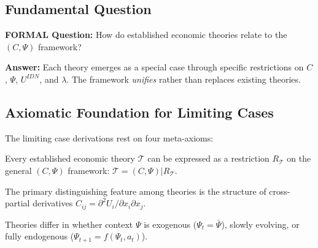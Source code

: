 
\subsection{Fundamental Question}

\begin{tcolorbox}[colback=purple!5!white, colframe=purple!75!black]
\textbf{FORMAL Question:} How do established economic theories relate to
the $(C, \Psi)$ framework?

\textbf{Answer:} Each theory emerges as a special case through specific
restrictions on $C$, $\Psi$, $U^{IDN}$, and $\lambda$. The framework
\textit{unifies} rather than replaces existing theories.
\end{tcolorbox}


\subsection{Axiomatic Foundation for Limiting Cases}
\label{sec:A-axioms}

The limiting case derivations rest on four meta-axioms:

\begin{axiom}
\label{ax:A-A1}
Every established economic theory $\mathcal{T}$ can be expressed as a
restriction $R_\mathcal{T}$ on the general $(C, \Psi)$ framework:
$\mathcal{T} = (C, \Psi) | R_\mathcal{T}$.
\end{axiom}

\begin{axiom}
\label{ax:A-A2}
The primary distinguishing feature among theories is the structure of
cross-partial derivatives $C_{ij} = \partial^2 U_i / \partial x_i \partial x_j$.
\end{axiom}

\begin{axiom}
\label{ax:A-A3}
Theories differ in whether context $\Psi$ is exogenous ($\Psi_t = \bar{\Psi}$),
slowly evolving, or fully endogenous ($\Psi_{t+1} = f(\Psi_t, a_t)$).
\end{axiom}

